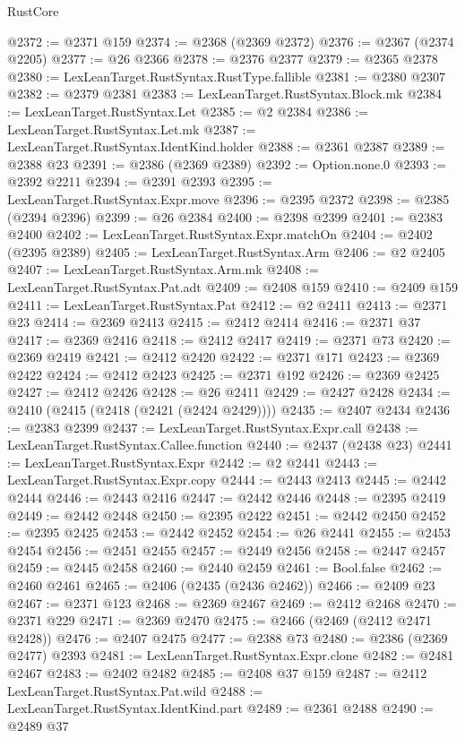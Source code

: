 \begin{lexlean}{RustCore}
\begin{coremodule}
@2372 := @2371 @159
@2374 := @2368 (@2369 @2372)
@2376 := @2367 (@2374 @2205)
@2377 := @26 @2366
@2378 := @2376 @2377
@2379 := @2365 @2378
@2380 := LexLeanTarget.RustSyntax.RustType.fallible
@2381 := @2380 @2307
@2382 := @2379 @2381
@2383 := LexLeanTarget.RustSyntax.Block.mk
@2384 := LexLeanTarget.RustSyntax.Let
@2385 := @2 @2384
@2386 := LexLeanTarget.RustSyntax.Let.mk
@2387 := LexLeanTarget.RustSyntax.IdentKind.holder
@2388 := @2361 @2387
@2389 := @2388 @23
@2391 := @2386 (@2369 @2389)
@2392 := Option.none.{0}
@2393 := @2392 @2211
@2394 := @2391 @2393
@2395 := LexLeanTarget.RustSyntax.Expr.move
@2396 := @2395 @2372
@2398 := @2385 (@2394 @2396)
@2399 := @26 @2384
@2400 := @2398 @2399
@2401 := @2383 @2400
@2402 := LexLeanTarget.RustSyntax.Expr.matchOn
@2404 := @2402 (@2395 @2389)
@2405 := LexLeanTarget.RustSyntax.Arm
@2406 := @2 @2405
@2407 := LexLeanTarget.RustSyntax.Arm.mk
@2408 := LexLeanTarget.RustSyntax.Pat.adt
@2409 := @2408 @159
@2410 := @2409 @159
@2411 := LexLeanTarget.RustSyntax.Pat
@2412 := @2 @2411
@2413 := @2371 @23
@2414 := @2369 @2413
@2415 := @2412 @2414
@2416 := @2371 @37
@2417 := @2369 @2416
@2418 := @2412 @2417
@2419 := @2371 @73
@2420 := @2369 @2419
@2421 := @2412 @2420
@2422 := @2371 @171
@2423 := @2369 @2422
@2424 := @2412 @2423
@2425 := @2371 @192
@2426 := @2369 @2425
@2427 := @2412 @2426
@2428 := @26 @2411
@2429 := @2427 @2428
@2434 := @2410 (@2415 (@2418 (@2421 (@2424 @2429))))
@2435 := @2407 @2434
@2436 := @2383 @2399
@2437 := LexLeanTarget.RustSyntax.Expr.call
@2438 := LexLeanTarget.RustSyntax.Callee.function
@2440 := @2437 (@2438 @23)
@2441 := LexLeanTarget.RustSyntax.Expr
@2442 := @2 @2441
@2443 := LexLeanTarget.RustSyntax.Expr.copy
@2444 := @2443 @2413
@2445 := @2442 @2444
@2446 := @2443 @2416
@2447 := @2442 @2446
@2448 := @2395 @2419
@2449 := @2442 @2448
@2450 := @2395 @2422
@2451 := @2442 @2450
@2452 := @2395 @2425
@2453 := @2442 @2452
@2454 := @26 @2441
@2455 := @2453 @2454
@2456 := @2451 @2455
@2457 := @2449 @2456
@2458 := @2447 @2457
@2459 := @2445 @2458
@2460 := @2440 @2459
@2461 := Bool.false
@2462 := @2460 @2461
@2465 := @2406 (@2435 (@2436 @2462))
@2466 := @2409 @23
@2467 := @2371 @123
@2468 := @2369 @2467
@2469 := @2412 @2468
@2470 := @2371 @229
@2471 := @2369 @2470
@2475 := @2466 (@2469 (@2412 @2471 @2428))
@2476 := @2407 @2475
@2477 := @2388 @73
@2480 := @2386 (@2369 @2477) @2393
@2481 := LexLeanTarget.RustSyntax.Expr.clone
@2482 := @2481 @2467
@2483 := @2402 @2482
@2485 := @2408 @37 @159
@2487 := @2412 LexLeanTarget.RustSyntax.Pat.wild
@2488 := LexLeanTarget.RustSyntax.IdentKind.part
@2489 := @2361 @2488
@2490 := @2489 @37

\end{coremodule}
\end{lexlean}
